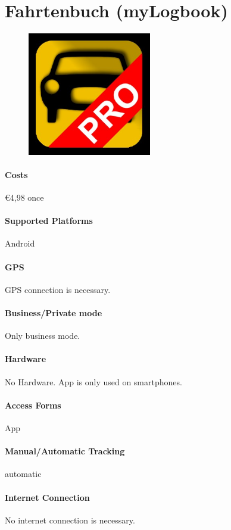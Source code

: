 \section{Fahrtenbuch (myLogbook)}
\begin{figure}
  \begin{center}
    \includegraphics[width=0.48\textwidth]{bilder/fahrtenbuch2}
  \end{center}
\end{figure}
\paragraph{Costs} \euro 4,98 once
\paragraph{Supported Platforms} Android 
\paragraph{GPS} GPS connection is necessary.
\paragraph{Business/Private mode} Only business mode.
\paragraph{Hardware} No Hardware. App is only used on smartphones.
\paragraph{Access Forms} App
\paragraph{Manual/Automatic Tracking} automatic
\paragraph{Internet Connection} No internet connection is necessary.
